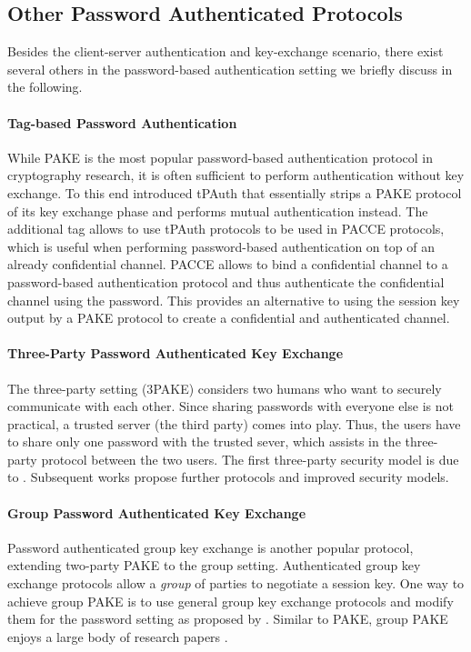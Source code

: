 \subsection{Other Password Authenticated Protocols} \label{sec:other-pake}
Besides the client-server authentication and key-exchange scenario, there exist several others in the password-based authentication setting we briefly discuss in the following.

\paragraph{Tag-based Password Authentication}
While \ac{PAKE} is the most popular password-based authentication protocol in cryptography research, it is often sufficient to perform authentication without key exchange.
To this end \citet{Manulis2014} introduced \ac{tPAuth} that essentially strips a \ac{PAKE} protocol of its key exchange phase and performs mutual authentication instead.
The additional tag allows to use \ac{tPAuth} protocols to be used in \ac{PACCE} protocols, which is useful when performing password-based authentication on top of an already confidential channel.
\ac{PACCE} allows to bind a confidential channel to a password-based authentication protocol and thus authenticate the confidential channel using the password.
This provides an alternative to using the session key output by a \ac{PAKE} protocol to create a confidential and authenticated channel.

\paragraph{Three-Party Password Authenticated Key Exchange}
The three-party setting (3\ac{PAKE}) considers two humans who want to securely communicate with each other.
Since sharing passwords with everyone else is not practical, a trusted server (the third party) comes into play.
Thus, the users have to share only one password with the trusted sever, which assists in the three-party protocol between the two users.
The first three-party security model is due to \citet{Abdalla2005}.
Subsequent works \cite{CliffTB06,Yoneyama08,TsaiC13} propose further protocols and improved security models.

\paragraph{Group Password Authenticated Key Exchange}
Password authenticated group key exchange is another popular protocol, extending two-party \ac{PAKE} to the group setting.
Authenticated group key exchange protocols allow a \emph{group} of parties to negotiate a session key.
One way to achieve group \ac{PAKE} is to use general group key exchange protocols and modify them for the password setting as proposed by \citet{Bresson02,BrChPo05}.
Similar to \ac{PAKE}, group \ac{PAKE} enjoys a large body of research papers \cite{Kim2004,Abdalla2006,Bohli2006,Dutta2006,AbdallaP06,AbdallaBVS07,AbdallaCCP09,AbdallaCGP11,hao2015fairy}.

